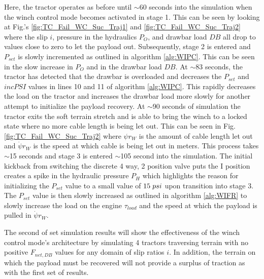 Here, the tractor operates as before until $\sim$60 seconds into the simulation when the winch control mode becomes activated in stage 1.  This can be seen by looking at Fig.'s \ref{fig:TC_Fail_WC_Suc_Traj1} and \ref{fig:TC_Fail_WC_Suc_Traj2} where the slip $i$, pressure in the hydraulics $P_O$, and drawbar load $DB$ all drop to values close to zero to let the payload out. Subsequently, stage 2 is entered and $P_{set}$ is slowly incremented as outlined in algorithm \ref{alg:WIPC}. This can be seen in the slow increase in $P_O$ and in the drawbar load $DB$. At $\sim$83 seconds, the tractor has detected that the drawbar is overloaded and decreases the $P_{set}$ and $incPSI$ values in lines 10 and 11 of algorithm \ref{alg:WIPC}. This rapidly decreases the load on the tractor and increases the drawbar load more slowly for another attempt to initialize the payload recovery. At $\sim$90 seconds of simulation the tractor exits the soft terrain stretch and is able to bring the winch to a locked state where no more cable length is being let out. This can be seen in Fig. \ref{fig:TC_Fail_WC_Suc_Traj2} where $\psi r_W$ is the amount of cable length let out and $\dot{\psi} r_W$ is the speed at which cable is being let out in meters. This process takes $\sim$15 seconds and stage 3 is entered $\sim$105 second into the simulation. The initial kickback from switching the discrete 4 way, 2 position valve puts the I position creates a spike in the hydraulic pressure $P_H$ which highlights the reason for initializing the $P_{set}$ value to a small value of $15\hspace{1mm}psi$ upon transition into stage 3. The $P_{set}$ value is then slowly increased as outlined in algorithm \ref{alg:WIFR} to slowly increase the load on the engine $\tau_{load}$ and the speed at which the payload is pulled in $\dot{\psi} r_W$.

The second of set simulation results will show the effectiveness of the winch control mode's architecture by simulating 4 tractors traversing terrain with no positive $F_{net,DB}$ values for any domain of slip ratios $i$. In addition, the terrain on which the payload must be recovered will not provide a surplus of traction as with the first set of results. 

